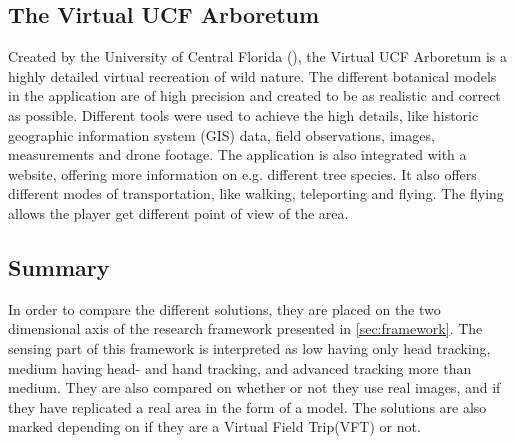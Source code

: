    \subsection{The Virtual UCF Arboretum}
        Created by the University of Central Florida (), the Virtual UCF Arboretum\cite{florida_vft} is a highly detailed virtual recreation of wild nature. The different botanical models in the application are of high precision and created to be as realistic and correct as possible. Different tools were used to achieve the high details, like historic geographic information system (GIS) data, field observations, images, measurements and drone footage. The application is also integrated with a website, offering more information on e.g. different tree species. It also offers different modes of transportation, like walking, teleporting and flying. The flying allows the player get different point of view of the area.
        
    \subsection{Summary}
        \label{sec:summary}
        In order to compare the different solutions, they are placed on the two dimensional axis of the research framework presented in \cref{sec:framework}. The sensing part of this framework is interpreted as low having only head tracking, medium having head- and hand tracking, and advanced tracking more than medium. They are also compared on whether or not they use real images, and if they have replicated a real area in the form of a model. The solutions are also marked depending on if they are a Virtual Field Trip(VFT) or not.
    

